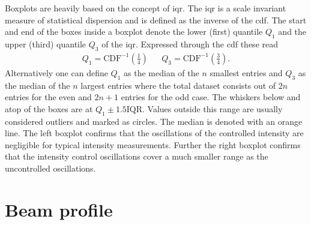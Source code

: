 Boxplots are heavily based on the concept of \gls{iqr}. The \gls{iqr} is a
scale invariant measure of statistical dispersion and is defined as the
inverse of the \gls{cdf}. The start and end of the boxes inside a boxplot
denote the lower (first) quantile $Q_1$ and the upper (third) quantile $Q_3$
of the \gls{iqr}. Expressed through the \gls{cdf} these read
\begin{align}
  Q_1=\text{CDF}^{-1}{\left(\frac{1}{4}\right)} &&
  Q_3=\text{CDF}^{-1}{\left(\frac{3}{4}\right)}.
\end{align}
Alternatively one can define $Q_1$ as the median of the $n$ smallest entries
and $Q_3$ as the median of the $n$ largest entries where the total dataset
consists out of $2n$ entries for the even and $2n+1$ entries for the odd case.
The whiskers below and atop of the boxes are at $Q_1\pm1.5\text{IQR}$. Values
outside this range are usually considered outliers and marked as circles. The
median is denoted with an orange line. The left boxplot confirms that the
oscillations of the controlled intensity are negligible for typical intensity
measurements. Further the right boxplot confirms that the intensity control
oscillations cover a much smaller range as the uncontrolled oscillations.

\section{Beam profile}

